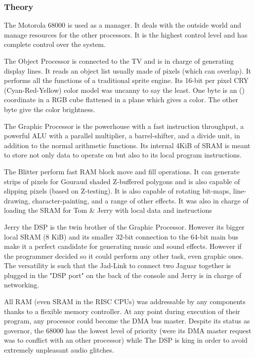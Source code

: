 \subsubsection{Theory}
\par
The Motorola 68000 is used as a manager. It deals with the outside world and manage resources for the other processors. It is the highest control level and has complete control over the system.\\
\par
The Object Processor is connected to the TV and is in charge of generating display lines. It reads an object list usually made of pixels (which can overlap). It performs all the functions of a traditional sprite engine. Its 16-bit per pixel CRY (Cyan-Red-Yellow) color model was uncanny to say the least. One byte is an () coordinate in a RGB cube flattened in a plane which gives a color. The other byte give the color brightness.\\
\par
{}
\par
\pagebreak
\par
{}
\par
The Graphic Processor is the powerhouse with a fast instruction throughput, a powerful ALU with a
parallel multiplier, a barrel-shifter, and a divide unit, in addition to the normal arithmetic functions. Its internal 4KiB of SRAM is meant to store not only data to operate on but also to its local program instructions.\\
\par
The Blitter perform fast RAM block move and fill operations. It can generate strips of pixels for Gouraud shaded Z-buffered polygons and is also capable of slipping pixels (based on Z-testing). It
is also capable of rotating bit-maps, line-drawing, character-painting, and a range of other effects. It was also in charge of loading the SRAM for Tom \& Jerry with local data and instructions\\
\par
Jerry the DSP is the twin brother of the Graphic Processor. However its bigger local SRAM (8 KiB) and its smaller 32-bit connection to the 64-bit main bus make it a perfect candidate for generating music and sound effects. However if the programmer decided so it could perform any other task, even graphic ones. The versatility is such that the Jad-Link to connect two Jaguar together is plugged in the "DSP port" on the back of the console and Jerry is in charge of networking.\\
\par
All RAM (even SRAM in the RISC CPUs) was addressable by any components thanks to a flexible memory controller. At any point during execution of their program, any processor could become the DMA bus master. Despite its status as governor, the 68000 has the lowest level of priority (were its DMA master request was to conflict with an other processor) while The DSP is king in order to avoid extremely unpleasant audio glitches.\\
\par



